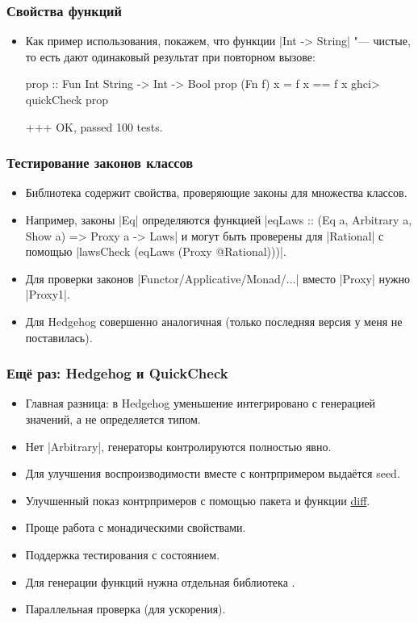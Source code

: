 \documentclass[11pt]{beamer}
\begin{document}
\begin{frame}[fragile]
  \frametitle{Свойства функций}
  \begin{itemize}
    \item Как пример использования, покажем, что функции \haskinline|Int -> String| "--- чистые, то есть дают одинаковый результат при повторном вызове:
          \begin{haskell}
            prop :: Fun Int String -> Int -> Bool
            prop (Fn f) x = f x == f x
            ghci> quickCheck prop
          \end{haskell}
          \begin{ghci}
            +++ OK, passed 100 tests.
          \end{ghci}
  \end{itemize}
\end{frame}

\begin{frame}[fragile]
  \frametitle{Тестирование законов классов}
  \begin{itemize}
    \item Библиотека  содержит свойства, проверяющие законы для множества классов.
    \item Например, законы \haskinline|Eq| определяются функцией \haskinline|eqLaws :: (Eq a, Arbitrary a, Show a) => Proxy a -> Laws| и могут быть проверены для \haskinline|Rational| с помощью \haskinline|lawsCheck (eqLaws (Proxy @Rational)))|.
    \item Для проверки законов \haskinline|Functor/Applicative/Monad/...| вместо \haskinline|Proxy| нужно \haskinline|Proxy1|.
    \item Для Hedgehog совершенно аналогичная  (только последняя версия у меня не поставилась).
  \end{itemize}
\end{frame}

\begin{frame}[fragile]
  \frametitle{Ещё раз: Hedgehog и QuickCheck}
  \begin{itemize}
    \item Главная разница: в Hedgehog уменьшение интегрировано с генерацией значений, а не определяется типом.
    \item Нет \haskinline|Arbitrary|, генераторы контролируются полностью явно.
    \item Для улучшения воспроизводимости вместе с контрпримером выдаётся seed.
    \item Улучшенный показ контрпримеров с помощью пакета  и функции \href{http://hackage.haskell.org/package/hedgehog-1.0/docs/Hedgehog.html#v:diff}{diff}.
    \item Проще работа с монадическими свойствами.
    \item Поддержка тестирования с состоянием.
    \item Для генерации функций нужна отдельная библиотека .
    \item Параллельная проверка (для ускорения).
  \end{itemize}
\end{frame}
\end{document}
